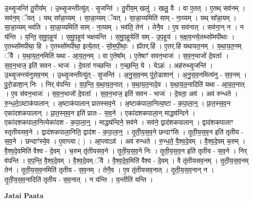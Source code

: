 \documentclass[17pt]{extarticle}
\begin{document}
उ॒थ्सृ॒जन्ति॑ तु॒रीय᳚म् । उ॒थ्सृ॒जन्तीत्यु॑त् - सृ॒जन्ति॑ । तु॒रीय॒म् खलु॑ । खलु॒ वै । वा ए॒तत् । ए॒तथ् सव॑नम् । सव॑न॒म् ॅयत् । यथ् सा᳚न्ना॒य्यम् । सा॒न्ना॒य्यम् ॅयत् । सा॒न्ना॒य्यमिति॑ साम् - ना॒य्यम् । यथ् सा᳚न्ना॒यम् । सा॒न्ना॒य्यम् भव॑ति । सा॒न्ना॒य्यमिति॑ साम् - ना॒य्यम् । भव॑ति॒ तेन॑ । तेनै॒व । ए॒व सव॑नात् । सव॑ना॒न् न । न य॑न्ति । य॒न्ति॒ स॒मु॒प॒हूय॑ । स॒मु॒प॒हूय॑ भक्षयन्ति । स॒मु॒प॒हूयेति॑ सम् - उ॒प॒हूय॑ । भ॒क्ष॒य॒न्त्ये॒तथ्सो॑मपीथाः । ए॒तथ्सो॑मपीथा॒ हि । ए॒तथ्सो॑मपीथा॒ इत्ये॒तत् - सो॒म॒पी॒थाः॒ । ह्ये॑तर्.हि॑ । ए॒तर्.हि॑ यथायत॒नम् । य॒था॒य॒त॒नम् ॅवै । य॒था॒य॒त॒नमिति॑ यथा - आ॒य॒त॒नम् । वा ए॒तेषा᳚म् । 
ए॒तेषाꣳ॑ सवन॒भाजः॑ । स॒व॒न॒भाजो॑ दे॒वताः᳚ । स॒व॒न॒भाज॒ इति॑ सवन - भाजः॑ । दे॒वता॑ गच्छन्ति । ग॒च्छ॒न्ति॒ ये । येऽहः॑ । अह॑रुथ्सृ॒जन्ति॑ । उ॒थ्सृ॒जन्त्य॑नुसव॒नम् । उ॒थ्सृ॒जन्तीत्यु॑त् - सृ॒जन्ति॑ । अ॒नु॒स॒व॒नम् पु॑रो॒डाशान्॑ । अ॒नु॒स॒व॒नमित्य॑नु - स॒व॒नम् । पु॒रो॒डाशा॒न् निः । निर् व॑पन्ति । व॒प॒न्ति॒ य॒था॒य॒त॒नात् । य॒था॒य॒त॒नादे॒व । य॒था॒य॒त॒नादिति॑ यथा - आ॒य॒त॒नात् । ए॒व स॑वन॒भाजः॑ । स॒व॒न॒भाजो॑ दे॒वताः᳚ । स॒व॒न॒भाज॒ इति॑ सवन - भाजः॑ । दे॒वता॒ अव॑ । अव॑ रुन्धते । रु॒न्ध॒ते॒ऽष्टाक॑पालान् । अ॒ष्टाक॑पालान् प्रातस्सव॒ने । अ॒ष्टाक॑पाला॒नित्य॒ष्टा - क॒पा॒ला॒न्॒ । प्रा॒त॒स्स॒व॒न एका॑दशकपालान् । प्रा॒त॒स्स॒व॒न इति॑ प्रातः - स॒व॒ने । एका॑दशकपाला॒न् माद्ध्य॑न्दिने । एका॑दशकपाला॒नित्येका॑दश - क॒पा॒ला॒न्॒ । माद्ध्य॑न्दिने॒ सव॑ने । सव॑ने॒ द्वाद॑शकपालान् । द्वाद॑शकपालाꣳ स्तृतीयसव॒ने । द्वाद॑शकपाला॒निति॒ द्वाद॑श - क॒पा॒ला॒न्॒ । तृ॒ती॒य॒स॒व॒ने छन्दाꣳ॑सि । तृ॒ती॒य॒स॒व॒न इति॑ तृतीय - स॒व॒ने । छन्दाꣳ॑स्ये॒व । ए॒वाप्त्वा ( ) । आ॒प्त्वाऽव॑ । अव॑ रुन्धते । रु॒न्ध॒ते॒ वै॒श्व॒दे॒वम् । वै॒श्व॒दे॒वम् च॒रुम् । वै॒श्व॒दे॒वमिति॑ वैश्व - दे॒वम् । च॒रुम् तृ॑तीयसव॒ने । तृ॒ती॒य॒स॒व॒ने निः । तृ॒ती॒य॒स॒व॒न इति॑ तृतीय - स॒व॒ने । निर् व॑पन्ति । व॒प॒न्ति॒ वै॒श्व॒दे॒वम् । वै॒श्व॒दे॒वम् ॅवै । वै॒श्व॒दे॒व॒मिति॑ वैश्व - दे॒वम् । वै तृ॑तीयसव॒नम् । तृ॒ती॒य॒स॒व॒नम् तेन॑ । तृ॒ती॒य॒स॒व॒नमिति॑ तृतीय - स॒व॒नम् । तेनै॒व । ए॒व तृ॑तीयसव॒नात् । तृ॒ती॒य॒स॒व॒नान् न । तृ॒ती॒य॒स॒व॒नादिति॑ तृतीय - स॒व॒नात् । न य॑न्ति । य॒न्तीति॑ यन्ति । \newline

\textbf{Jatai Paata} \newline
\end{document}
